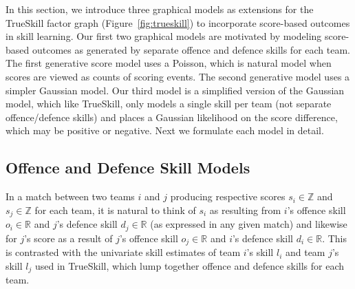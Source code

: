 \label{sec:PoissonGaussianModels}

In this section, we introduce three graphical models as extensions for
the TrueSkill factor graph (Figure~\ref{fig:trueskill}) to incorporate
score-based outcomes in skill learning.  Our first two graphical
models are motivated by modeling score-based outcomes as generated by
separate offence and defence skills for each team.  The first
generative score model uses a Poisson, which is natural model when
scores are viewed as counts of scoring events.  The second generative
model uses a simpler Gaussian model.  Our third model is a simplified
version of the Gaussian model, which like TrueSkill, only models a
single skill per team (not separate offence/defence skills) and places
a Gaussian likelihood on the score difference, which may be positive
or negative.  Next we formulate each model in detail.

\subsection{Offence and Defence Skill Models}
\label{sec:PoissonGraphicalModel}

In a match between two teams $i$ and $j$ producing respective scores
$s_i \in \mathbb{Z}$ and $s_j \in \mathbb{Z}$ for each team, it is natural to
think of $s_i$ as resulting from $i$'s offence skill $o_i \in \mathbb{R}$
and $j$'s defence skill $d_j \in \mathbb{R}$
(as expressed in any given match) and
likewise for $j$'s score as a result of $j$'s offence skill
$o_j \in \mathbb{R}$
and $i$'s defence skill $d_i \in \mathbb{R}$.  This is contrasted
with the univariate skill estimates of team $i$'s skill $l_i$
and team $j$'s skill $l_j$ used in TrueSkill, which lump together
offence and defence skills for each team.

